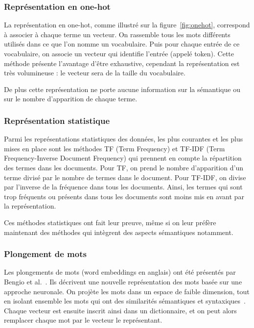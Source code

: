 \subsubsection{Représentation en one-hot}
La représentation en one-hot, comme illustré sur la figure~\ref{fig:onehot}, correspond à associer à chaque terme un vecteur. On rassemble tous les mots différents utilisés dans ce que l'on nomme un vocabulaire. Puis pour chaque entrée de ce vocabulaire, on associe un vecteur qui identifie l'entrée (appelé token). Cette méthode présente l'avantage d'être exhaustive, cependant la représentation est très volumineuse : le vecteur sera de la taille du vocabulaire.



De plus cette représentation ne porte aucune information sur la sémantique ou sur le nombre d'apparition de chaque terme.

\subsubsection{Représentation statistique}
Parmi les représentations statistiques des données, les plus courantes et les plus mises en place sont les méthodes TF (Term Frequency) et TF-IDF (Term Frequency-Inverse Document Frequency) qui prennent en compte la répartition des termes dans les documents. Pour TF, on prend le nombre d'apparition d'un terme divisé par le nombre de termes dans le document. Pour TF-IDF, on divise par l'inverse de la fréquence dans tous les documents. Ainsi, les termes qui sont trop fréquents ou présents dans tous les documents sont moins mis en avant par la représentation.

Ces méthodes statistiques ont fait leur preuve, même si on leur préfère maintenant des méthodes qui intègrent des aspects sémantiques notamment.

\subsubsection{Plongement de mots}


Les plongements de mots (word embeddings en anglais) ont été présentés par Bengio et al.~\cite{Bengio2003}. Ils décrivent une nouvelle représentation des mots basée sur une approche neuronale. On projète les mots dans un espace de faible dimension, tout en isolant ensemble les mots qui ont des similarités sémantiques et syntaxiques~\cite{Ghannay2017}. Chaque vecteur est ensuite inscrit ainsi dans un dictionnaire, et on peut alors remplacer chaque mot par le vecteur le représentant.

